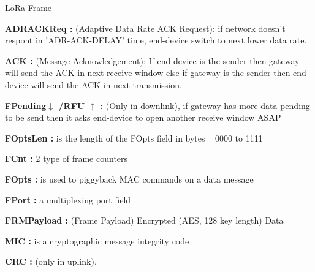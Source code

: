 \begin{frame}{LoRa Frame}{}
\begin{multicols}{2}
{{	}
	\item \textbf{ADRACKReq :} (Adaptive Data Rate ACK Request): if network doesn't respont in 'ADR-ACK-DELAY' time, end-device switch to next lower data rate.
	\item \textbf{ACK :} (Message Acknowledgement): If end-device is the sender then gateway will send the ACK in next receive window  else if gateway is the sender then end-device will send the ACK in next transmission.
	\item \textbf{FPending$\downarrow$ /RFU $\uparrow$ :} (Only in downlink), if gateway has more data pending to be send then it asks end-device to open another receive window ASAP
	\item \textbf{FOptsLen :} is the length of the FOpts field in bytes   0000 to 1111 
	\item \textbf{FCnt :}  2 type of frame counters 
	\item \textbf{FOpts :} is used to piggyback MAC commands on a data message	
	\item \textbf{FPort :}  a multiplexing port field
    \item \textbf{FRMPayload :} (Frame Payload)  Encrypted (AES, 128 key length) Data                                 
	\item \textbf{MIC :}  is a cryptographic message integrity code
	\item \textbf{CRC :} (only in uplink), 
}

\end{multicols}
 \end{frame}




